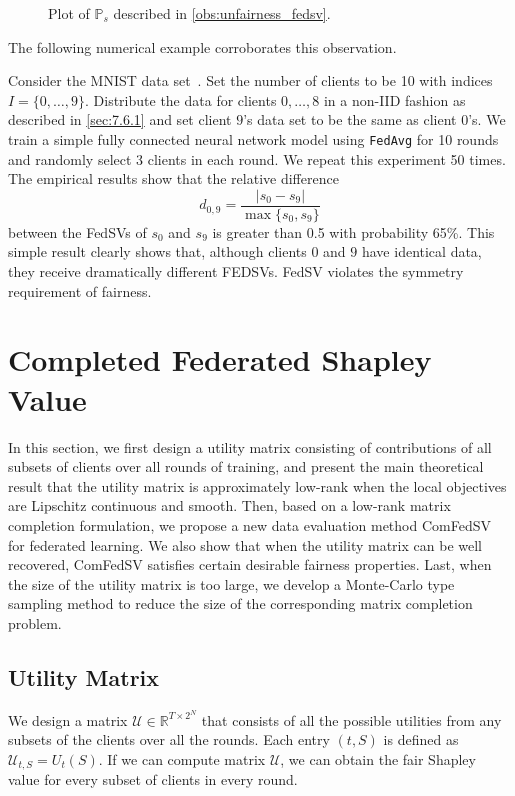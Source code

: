 \begin{observation}
\begin{figure}[t]
        \caption{Plot of $\mathbb{P}_s$ described in \autoref{obs:unfairness_fedsv}.}
        \label{fig:ps}
    \end{figure}
\end{observation}

The following numerical example corroborates this observation.

\begin{example} \label{ex:1}
    Consider the MNIST data set~\cite{lecun-mnisthandwrittendigit-2010}. Set the number of clients to be 10 with indices $I = \{0, \dots, 9\}$. Distribute the data for clients $0, \dots, 8$ in a non-IID fashion as described in \autoref{sec:7.6.1} and set client $9$'s data set to be the same as client $0$'s. We train a simple fully connected neural network model using \texttt{FedAvg} for 10 rounds and randomly select 3 clients in each round. We repeat this experiment 50 times. The empirical results show that the relative difference 
    \begin{equation} \label{eq:relative_difference}
            d_{0,9} = \frac{|s_0 - s_9|}{\max\{s_0, s_9\}}
    \end{equation}
    between the FedSVs of $s_0$ and $s_{9}$ is greater than 0.5 with probability 65\%. This simple result clearly shows that, although clients $0$ and $9$ have identical data, they receive dramatically different FEDSVs. FedSV violates the symmetry requirement of fairness.  
\end{example}


\section{Completed Federated Shapley Value} \label{sec:7.5}

In this section, we first design a utility matrix consisting of contributions of all subsets of clients over all rounds of training, and present the main theoretical result that the utility matrix is approximately low-rank when the local objectives are Lipschitz continuous and smooth. Then, based on a low-rank matrix completion formulation, we propose a new data evaluation method ComFedSV for federated learning. We also show that when the utility matrix can be well recovered, ComFedSV satisfies certain desirable fairness properties. Last, when the size of the utility matrix is too large, we develop a Monte-Carlo type sampling method to reduce the size of the corresponding matrix completion problem.

\subsection{Utility Matrix} \label{sec:7.5.1}
We design a matrix $\mathcal{U} \in \mathbb{R}^{T \times 2^N}$ that consists of all the possible utilities from any subsets of the clients over all the rounds. Each entry $(t, S)$ is defined as 
$\mathcal{U}_{t, S} = U_t(S)$. If we can compute matrix $\mathcal{U}$, we can obtain the fair Shapley value for every subset of clients in every round.

